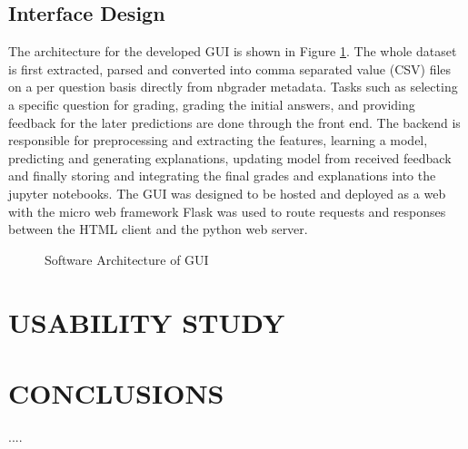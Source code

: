 \documentclass[letterpaper, 10 pt, conference]{ieeeconf}  %
\begin{document}
\subsection{Interface Design}

The architecture for the developed GUI is shown in Figure \ref{fig:arch}. The whole dataset is first extracted, parsed and converted into comma separated value (CSV) files on a per question basis directly from nbgrader metadata. Tasks such as selecting a specific question for grading, grading the initial answers, and providing feedback for the later predictions are done through the front end. The backend is responsible for preprocessing and extracting the features, learning a model, predicting and generating explanations, updating model from received feedback and finally storing and integrating the final grades and explanations into the jupyter notebooks. The GUI was designed to be hosted and deployed as a web with the micro web framework Flask was used to route requests and responses between the HTML client and the python web server.
\begin{figure}[H]
\caption{Software Architecture of GUI}
\label{fig:arch}
\end{figure}

\section{USABILITY STUDY} 

\section{CONCLUSIONS}

....
\end{document}
